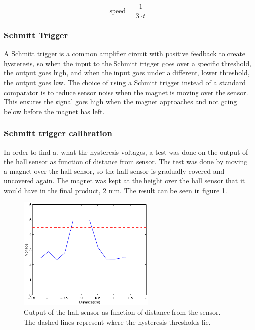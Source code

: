 \begin{equation} \label{eq:calc_speed}
 \text{speed} = \frac{1}{3\cdot t}
\end{equation}

\subsubsection{Schmitt Trigger}
A Schmitt trigger is a common amplifier circuit with positive feedback to create hysteresis, so when the input to the Schmitt trigger goes over a specific threshold, the output goes high, and when the input goes under a different, lower threshold, the output goes low.
The choice of using a Schmitt trigger instead of a standard comparator is to reduce sensor noise when the magnet is moving over the sensor.
This ensures the signal goes high when the magnet approaches and not going below before the magnet has left.

\subsubsection{Schmitt trigger calibration} \label{sec:schmitt_cal}
In order to find at what the hysteresis voltages, a test was done on the output of the hall sensor as function of distance from sensor.
The test was done by moving a magnet over the hall sensor, so the hall sensor is gradually covered and uncovered again. The magnet was kept at the height over the hall sensor that it would have in the final product, 2 mm. 
The result can be seen in figure \ref{fig:hall_out}.

\begin{figure}
 \centering
 \includegraphics[width=0.6\textwidth]{img/hall_out}
 \caption{Output of the hall sensor as function of distance from the sensor. The dashed lines represent where the hysteresis thresholds lie.}
 \label{fig:hall_out}
\end{figure}

